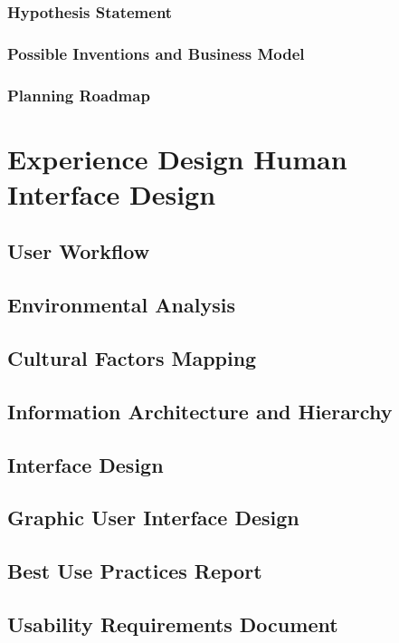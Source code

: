 \documentclass[a4paper, 10pt]{article}
\begin{document}
		\subsubsection{Hypothesis Statement}
		\subsubsection{Possible Inventions and Business Model}
		\subsubsection{Planning Roadmap}
		
\pagebreak
		
\section{Experience Design \- Human Interface Design}
	\subsection{User Workflow}
	\subsection{Environmental Analysis}
	\subsection{Cultural Factors Mapping}
	\subsection{Information Architecture and Hierarchy}
	\subsection{Interface Design}
	\subsection{Graphic User Interface Design}
	\subsection{Best Use Practices Report}
	\subsection{Usability Requirements Document}
	
\pagebreak
	
\end{document}
